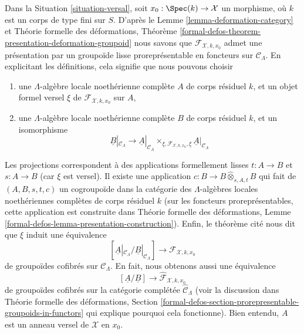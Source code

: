 \begin{remark}
\label{remark-groupoid-defo}
Dans la Situation \ref{situation-versal}, soit $x_0 : \Spec(k) \to \mathcal{X}$
un morphisme, où $k$ est un corps de type fini sur $S$.
D'après le Lemme \ref{lemma-deformation-category} et
Théorie formelle des déformations, Théorème
\ref{formal-defos-theorem-presentation-deformation-groupoid}
nous savons que $\mathcal{F}_{\mathcal{X}, k, x_0}$ admet une
présentation par un groupoïde lisse proreprésentable en
foncteurs sur $\mathcal{C}_\Lambda$.
En explicitant les définitions, cela signifie que nous pouvons choisir
\begin{enumerate}
\item une $\Lambda$-algèbre locale noethérienne complète $A$
de corps résiduel $k$, et un objet formel versel $\xi$
de $\mathcal{F}_{\mathcal{X}, k, x_0}$ sur $A$,
\item une $\Lambda$-algèbre locale noethérienne complète $B$
de corps résiduel $k$, et un isomorphisme
$$
\underline{B}|_{\mathcal{C}_\Lambda}
\longrightarrow
\underline{A}|_{\mathcal{C}_\Lambda}
\times_{\underline{\xi}, \mathcal{F}_{\mathcal{X}, k, x_0}, \underline{\xi}}
\underline{A}|_{\mathcal{C}_\Lambda}
$$
\end{enumerate}
Les projections correspondent à des applications formellement lisses
$t : A \to B$ et $s : A \to B$ (car $\xi$ est versel).
Il existe une application $c : B \to B \widehat{\otimes}_{s, A, t} B$
qui fait de $(A, B, s, t, c)$ un cogroupoïde dans la catégorie
des $\Lambda$-algèbres locales noethériennes complètes de corps résiduel $k$
(sur les foncteurs proreprésentables, cette application est construite dans
Théorie formelle des déformations, Lemme
\ref{formal-defos-lemma-presentation-construction}).
Enfin, le théorème cité nous dit que $\xi$ induit
une équivalence
$$
[\underline{A}|_{\mathcal{C}_\Lambda} / \underline{B}|_{\mathcal{C}_\Lambda}]
\longrightarrow
\mathcal{F}_{\mathcal{X}, k, x_0}
$$
de groupoïdes cofibrés sur $\mathcal{C}_\Lambda$. En fait, nous obtenons aussi
une équivalence
$$
[\underline{A}/\underline{B}]
\longrightarrow
\widehat{\mathcal{F}}_{\mathcal{X}, k, x_0}
$$
de groupoïdes cofibrés sur la catégorie complétée
$\widehat{\mathcal{C}}_\Lambda$ (voir la discussion dans
Théorie formelle des déformations, Section
\ref{formal-defos-section-prorepresentable-groupoids-in-functors}
qui explique pourquoi cela fonctionne). Bien entendu, $A$ est un anneau versel de
$\mathcal{X}$ en $x_0$.
\end{remark}








